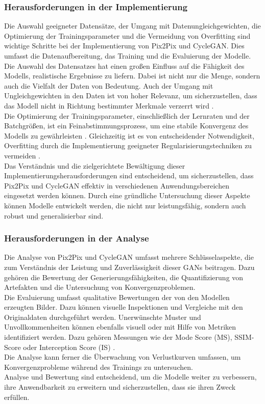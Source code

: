 \subsubsection{Herausforderungen in der Implementierung}
Die Auswahl geeigneter Datensätze, der Umgang mit Datenungleichgewichten, die Optimierung der Trainingsparameter und die Vermeidung von Overfitting sind wichtige Schritte bei der Implementierung von Pix2Pix und CycleGAN. Dies umfasst die Datenaufbereitung, das Training und die Evaluierung der Modelle. 
\\
Die Auswahl des Datensatzes hat einen großen Einfluss auf die Fähigkeit des Modells, realistische Ergebnisse zu liefern. Dabei ist nicht nur die Menge, sondern auch die Vielfalt der Daten von Bedeutung. Auch der Umgang mit Ungleichgewichten in den Daten ist von hoher Relevanz, um sicherzustellen, dass das Modell nicht in Richtung bestimmter Merkmale verzerrt wird \cite{Yamashita.2018}.
\\
Die Optimierung der Trainingsparameter, einschließlich der Lernraten und der Batchgrößen, ist ein Feinabstimmungsprozess, um eine stabile Konvergenz des Modells zu gewährleisten \cite{Saxena.2021}. Gleichzeitig ist es von entscheidender Notwendigkeit, Overfitting durch die Implementierung geeigneter Regularisierungstechniken zu vermeiden \cite{Yamashita.2018}.
\\
Das Verständnis und die zielgerichtete Bewältigung dieser Implementierungsherausforderungen sind entscheidend, um sicherzustellen, dass Pix2Pix und CycleGAN effektiv in verschiedenen Anwendungsbereichen eingesetzt werden können. Durch eine gründliche Untersuchung dieser Aspekte können Modelle entwickelt werden, die nicht nur leistungsfähig, sondern auch robust und generalisierbar sind.

\subsubsection{Herausforderungen in der Analyse}
Die Analyse von Pix2Pix und CycleGAN umfasst mehrere Schlüsselaspekte, die zum Verständnis der Leistung und Zuverlässigkeit dieser GANs beitragen. Dazu gehören die Bewertung der Generierungsfähigkeiten, die Quantifizierung von Artefakten und die Untersuchung von Konvergenzproblemen. 
\\
Die Evaluierung umfasst qualitative Bewertungen der von den Modellen erzeugten Bilder. Dazu können visuelle Inspektionen und Vergleiche mit den Originaldaten durchgeführt werden. Unerwünschte Muster und Unvollkommenheiten können ebenfalls visuell oder mit Hilfe von Metriken identifiziert werden. Dazu gehören Messungen wie der Mode Score (MS), SSIM-Score oder Interception Score (IS) \cite{Pan.2019}. \\ Die Analyse kann ferner die Überwachung von Verlustkurven umfassen, um Konvergenzprobleme während des Trainings zu untersuchen. 
\\
Analyse und Bewertung sind entscheidend, um die Modelle weiter zu verbessern, ihre Anwendbarkeit zu erweitern und sicherzustellen, dass sie ihren Zweck erfüllen.